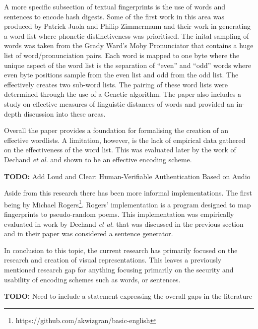 A more specific subsection of textual fingerprints is the use of words and sentences to encode hash digests. Some of the first work in this area was produced by Patrick Juola and Philip Zimmermann 
\cite{juola1996whole} and their work in generating a word list where phonetic distinctiveness was prioritised. 
The inital sampling of words was taken from the Grady Ward's Moby Pronunciator that contains a huge list of word/pronunciation pairs. Each word is mapped to one byte where the unique aspect of the word list is the separation of ``even'' and ``odd'' words where even byte positions sample from the even list and odd from the odd list. The effectively creates two sub-word lists. The pairing of these word lists were determined through the use of a Genetic algorithm. The paper also includes a study on effective measures of linguistic distances of words and provided an in-depth discussion into these areas.

Overall the paper provides a foundation for formalising the creation of an effective wordlists. A limitation, however, is the lack of empirical data gathered on the effectiveness of the word list. This was evaluated later by the work of Dechand \textit{et al.}
\cite{dechand2016empirical} and shown to be an effective encoding scheme.

\textbf{TODO: } Add Loud and Clear: Human-Verifiable Authentication Based on Audio

Aside from this research there has been more informal implementations. The first being by Michael Rogers\footnote{https://github.com/akwizgran/basic-english}. Rogers' implementation is a program designed to map fingerprints to pseudo-random poems. This implementation was empirically evaluated in work by Dechand \textit{et al.} that was discussed in the previous section and in their paper was considered a sentence generator. 

In conclusion to this topic, the current research has primarily focused on the research and creation of visual representations. This leaves a previously mentioned research gap for anything focusing primarily on the security and usability of encoding schemes such as words, or sentences.

\textbf{TODO: } Need to include a statement expressing the overall gaps in the literature
